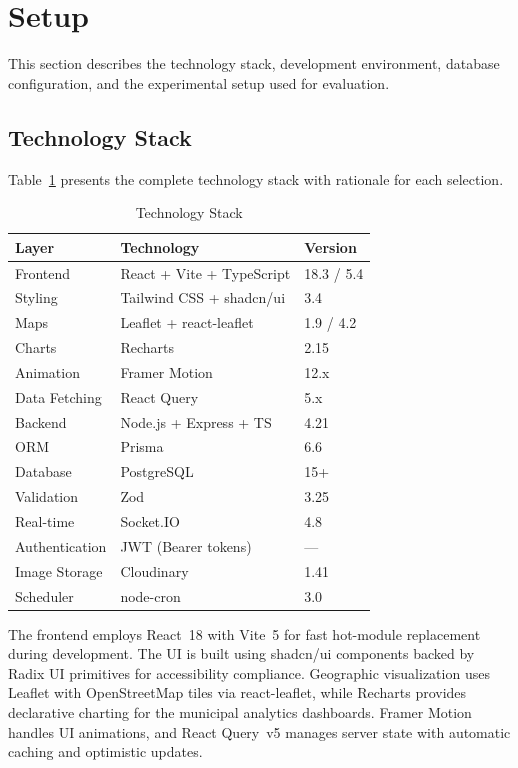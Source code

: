 \documentclass[conference]{IEEEtran}
\begin{document}
\section{Setup}

This section describes the technology stack, development environment, database configuration, and the experimental setup used for evaluation.

\subsection{Technology Stack}

Table~\ref{tab:stack} presents the complete technology stack with rationale for each selection.

\begin{table}[htbp]
\caption{Technology Stack}
\begin{center}
\begin{tabular}{lll}
\toprule
\textbf{Layer} & \textbf{Technology} & \textbf{Version} \\
\midrule
Frontend & React + Vite + TypeScript & 18.3 / 5.4 \\
Styling & Tailwind CSS + shadcn/ui & 3.4 \\
Maps & Leaflet + react-leaflet & 1.9 / 4.2 \\
Charts & Recharts & 2.15 \\
Animation & Framer Motion & 12.x \\
Data Fetching & React Query & 5.x \\
Backend & Node.js + Express + TS & 4.21 \\
ORM & Prisma & 6.6 \\
Database & PostgreSQL & 15+ \\
Validation & Zod & 3.25 \\
Real-time & Socket.IO & 4.8 \\
Authentication & JWT (Bearer tokens) & --- \\
Image Storage & Cloudinary & 1.41 \\
Scheduler & node-cron & 3.0 \\
\bottomrule
\end{tabular}
\label{tab:stack}
\end{center}
\end{table}

The frontend employs React~18 with Vite~5 for fast hot-module replacement during development. The UI is built using shadcn/ui components backed by Radix UI primitives for accessibility compliance. Geographic visualization uses Leaflet with OpenStreetMap tiles via react-leaflet, while Recharts provides declarative charting for the municipal analytics dashboards. Framer Motion handles UI animations, and React Query~v5 manages server state with automatic caching and optimistic updates.
\end{document}
